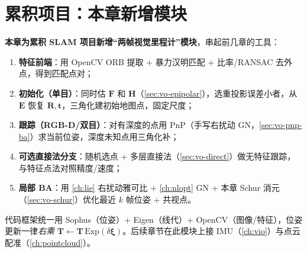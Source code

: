 \section*{累积项目：本章新增模块}
\textbf{本章为累积 SLAM 项目新增“两帧视觉里程计”模块}，串起前几章的工具：
\begin{enumerate}
  \item \textbf{特征前端}：用 OpenCV ORB 提取 + 暴力汉明匹配 + 比率/RANSAC 去外点，得到匹配点对；
  \item \textbf{初始化（单目）}：同时估 $\mathbf{F}$ 和 $\mathbf{H}$（\cref{sec:vo-epipolar}），选重投影误差小者，从 $\mathbf{E}$ 恢复 $\mathbf{R},\mathbf{t}$，三角化建初始地图点，固定尺度；
  \item \textbf{跟踪（RGB-D/双目）}：对有深度的点用 PnP（手写右扰动 GN，\cref{sec:vo-pnp-ba}）求当前位姿，深度未知点用三角化补；
  \item \textbf{可选直接法分支}：随机选点 + 多层直接法（\cref{sec:vo-direct}）做无特征跟踪，与特征点法对照精度/速度；
  \item \textbf{局部 BA}：用 \cref{ch:lie} 右扰动雅可比 + \cref{ch:nlopt} GN + 本章 Schur 消元（\cref{sec:vo-schur}）优化最近 $k$ 帧位姿 + 共视点。
\end{enumerate}
代码框架统一用 Sophus（位姿）+ Eigen（线代）+ OpenCV（图像/特征），位姿更新一律\emph{右乘} $\mathbf{T}\leftarrow\mathbf{T}\,\mathrm{Exp}(\delta\boldsymbol{\xi})$。后续章节在此模块上接 IMU（\cref{ch:vio}）与点云配准（\cref{ch:pointcloud}）。

